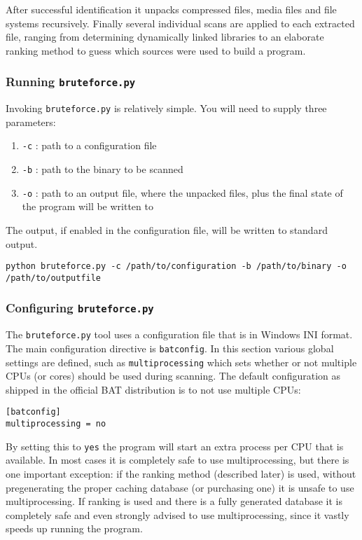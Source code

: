 \documentclass[10pt]{article}
\begin{document}
After successful identification it unpacks compressed files, media files and
file systems recursively. Finally several individual scans are applied to each
extracted file, ranging from determining dynamically linked libraries to an
elaborate ranking method to guess which sources were used to build a program.

\subsubsection{Running \texttt{bruteforce.py}}

Invoking \texttt{bruteforce.py} is relatively simple. You will need to supply
three parameters:

\begin{enumerate}
\item \texttt{-c} : path to a configuration file
\item \texttt{-b} : path to the binary to be scanned
\item \texttt{-o} : path to an output file, where the unpacked files, plus the
final state of the program will be written to
\end{enumerate}

The output, if enabled in the configuration file, will be written to standard
output.

\texttt{python bruteforce.py -c /path/to/configuration -b /path/to/binary -o /path/to/outputfile}

\subsubsection{Configuring \texttt{bruteforce.py}}

The \texttt{bruteforce.py} tool uses a configuration file that is in Windows
INI format. The main configuration directive is \texttt{batconfig}. In this
section various global settings are defined, such as \texttt{multiprocessing}
which sets whether or not multiple CPUs (or cores) should be used during
scanning. The default configuration as shipped in the official BAT distribution
is to not use multiple CPUs:

\begin{verbatim}
[batconfig]
multiprocessing = no
\end{verbatim}

By setting this to \texttt{yes} the program will start an extra process per CPU
that is available. In most cases it is completely safe to use multiprocessing,
but there is one important exception: if the ranking method (described later)
is used, without pregenerating the proper caching database (or purchasing one)
it is unsafe to use multiprocessing. If ranking is used and there is a fully
generated database it is completely safe and even strongly advised to use
multiprocessing, since it vastly speeds up running the program.
\end{document}
